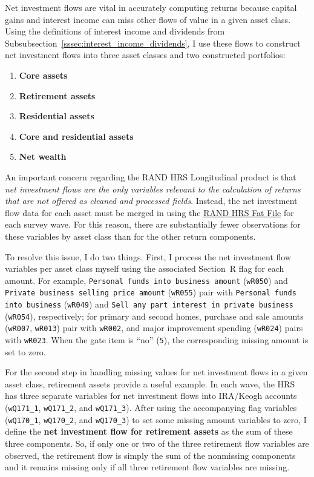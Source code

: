 \par Net investment flows are vital in accurately computing returns because capital gains and interest income can miss other flows of value in a given asset class. Using the definitions of interest income and dividends from Subsubsection~\ref{sssec:interest_income_dividends}, I use these flows to construct net investment flows into three asset classes and two constructed portfolios:

\begin{enumerate}
  \item \textbf{Core assets}
  \item \textbf{Retirement assets}
  \item \textbf{Residential assets}
  \item \textbf{Core and residential assets}
  \item \textbf{Net wealth}
\end{enumerate}

\par An important concern regarding the RAND HRS Longitudinal product is that \textit{net investment flows are the only variables relevant to the calculation of returns that are not offered as cleaned and processed fields}. Instead, the net investment flow data for each asset must be merged in using the \href{https://hrsdata.isr.umich.edu/data-products/rand}{RAND HRS Fat File} for each survey wave. For this reason, there are substantially fewer observations for these variables by asset class than for the other return components. 

\par To resolve this issue, I do two things. First, I process the net investment flow variables per asset class myself using the associated Section~R flag for each amount. For example, \texttt{Personal funds into business amount} (\texttt{wR050}) and \texttt{Private business selling price amount} (\texttt{wR055}) pair with \texttt{Personal funds into business} (\texttt{wR049}) and \texttt{Sell any part interest in private business} (\texttt{wR054}), respectively; for primary and second homes, purchase and sale amounts (\texttt{wR007}, \texttt{wR013}) pair with \texttt{wR002}, and major improvement spending (\texttt{wR024}) pairs with \texttt{wR023}. When the gate item is ``no'' (\texttt{5}), the corresponding missing amount is set to zero. 


\par For the second step in handling missing values for net investment flows in a given asset class, retirement assets provide a useful example. In each wave, the HRS has three separate variables for net investment flows into IRA/Keogh accounts (\texttt{wQ171\_1}, \texttt{wQ171\_2}, and \texttt{wQ171\_3}). After using the accompanying flag variables (\texttt{wQ170\_1}, \texttt{wQ170\_2}, and \texttt{wQ170\_3}) to set some missing amount variables to zero, I define the \textbf{net investment flow for retirement assets} as the sum of these three components. So, if only one or two of the three retirement flow variables are observed, the retirement flow is simply the sum of the nonmissing components and it remains missing only if all three retirement flow variables are missing. 

